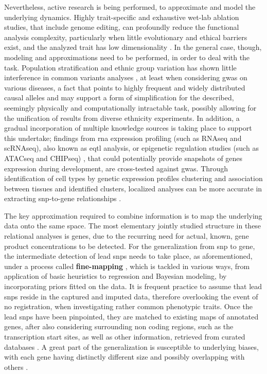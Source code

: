 Nevertheless, active research is being performed, to approximate and model the underlying dynamics. Highly trait-specific and exhaustive wet-lab ablation studies, that include genome editing, can profoundly reduce the functional analysis complexity, particularly when little evolutionary and ethical barriers exist, and the analyzed trait has low dimensionality \cite{Rao2021}. In the general case, though, modeling and approximations need to be performed, in order to deal with the task. Population stratification and ethnic group variation has shown little interference in common variants analyses \cite{Visscher2012}, at least when considering \ac{gwas} on various diseases, a fact that points to highly frequent and widely distributed causal alleles and may support a form of simplification for the described, seemingly physically and computationally intractable task, possibly allowing for the unification of results from diverse ethnicity experiments. In addition, a gradual incorporation of multiple knowledge sources is taking place to support this undertake; findings from \ac{rna} expression profiling (such as RNAseq and scRNAseq), also known as \ac{eqtl} analysis, \cite{Yan2020,Zhou2022} or epigenetic regulation studies (such as ATACseq and CHIPseq) \cite{Corces2020,Huo2019}, that could potentially provide snapshots of genes expression during development, are cross-tested against \ac{gwas}. Through identification of cell types by genetic expression profiles clustering and association between tissues and identified clusters, localized analyses can be more accurate in extracting \ac{snp}-to-gene relationships \cite{Cano-Gamez2020}.

The key approximation required to combine information is to map the underlying data onto the same space. The most elementary jointly studied structure in these relational analyses is genes, due to the recurring need for actual, known, gene product concentrations to be detected. For the generalization from \ac{snp} to gene, the intermediate detection of lead \acp{snp} needs to take place, as aforementioned, under a process called \textbf{fine-mapping} \cite{Schaid2018}, which is tackled in various ways, from application of basic heuristics to regression and Bayesian modeling, by incorporating priors fitted on the data. It is frequent practice to assume that lead \acp{snp} reside in the captured and imputed data, therefore overlooking the event of no registration, when investigating rather common phenotypic traits. Once the lead \acp{snp} have been pinpointed, they are matched to existing maps of annotated genes, after also considering surrounding non coding regions, such as the transcription start sites, as well as other information, retrieved from curated databases \cite{Wang2010,McLean2010}. A great part of the generalization is susceptible to underlying biases, with each gene having distinctly different size and possibly overlapping with others \cite{Wang2011}.


